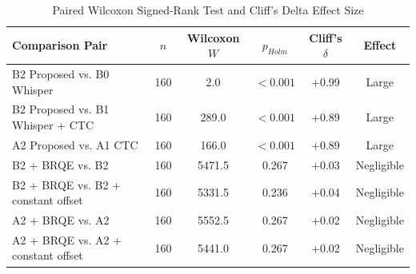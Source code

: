 \begin{table}[t]
\centering
\caption{Paired Wilcoxon Signed-Rank Test and Cliff's Delta Effect Size}
\label{tab:statistical_significance}
\begin{tabular}{lccccc}
\toprule
Comparison Pair & \(n\) & Wilcoxon \(W\) & \(p_{Holm}\) & Cliff's \(\delta\) & Effect \\
\midrule
B2 Proposed vs. B0 Whisper & 160 & 2.0 & $< 0.001$ & +0.99 & Large \\
B2 Proposed vs. B1 Whisper + CTC & 160 & 289.0 & $< 0.001$ & +0.89 & Large \\
A2 Proposed vs. A1 CTC & 160 & 166.0 & $< 0.001$ & +0.89 & Large \\
B2 + BRQE vs. B2 & 160 & 5471.5 & 0.267 & +0.03 & Negligible \\
B2 + BRQE vs. B2 + constant offset & 160 & 5331.5 & 0.236 & +0.04 & Negligible \\
A2 + BRQE vs. A2 & 160 & 5552.5 & 0.267 & +0.02 & Negligible \\
A2 + BRQE vs. A2 + constant offset & 160 & 5441.0 & 0.267 & +0.02 & Negligible \\
\bottomrule
\end{tabular}
\end{table}
